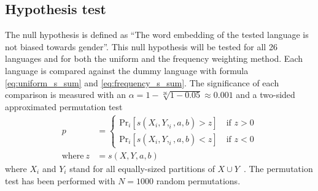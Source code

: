 \subsection{Hypothesis test} \label{sec:hypothesis_test}
The null hypothesis is defined as ``The word embedding of the tested language is
not biased towards gender''. This null hypothesis will be tested for all 26 languages
and for both the uniform and the frequency weighting method.
Each language is compared against the dummy language with formula \eqref{eq:uniform_s_sum}
and \eqref{eq:frequency_s_sum}. 
The significance of each comparison is measured with an 
${\alpha = 1-\sqrt[26]{1 - 0.05} \approx 0.001}$ and
a two-sided approximated permutation test
\begin{align}\label{eq:setup_p_test}
    p &= \begin{cases}
    \text{Pr}_i[s(X_i, Y,_i, a, b) > z] \quad \text{if } z > 0 \\
    \text{Pr}_i[s(X_i, Y,_i, a, b) < z] \quad \text{if } z < 0
\end{cases}\nonumber \\
\text{where} \ z &= s(X,Y,a,b)
\end{align}
where $X_i$ and $Y_i$ stand for all equally-sized partitions of
$X \cup Y$~\parencite{caliskan_2017_semantics_language_corpora}. The permutation test has
been performed with $N = 1000$ random permutations.

